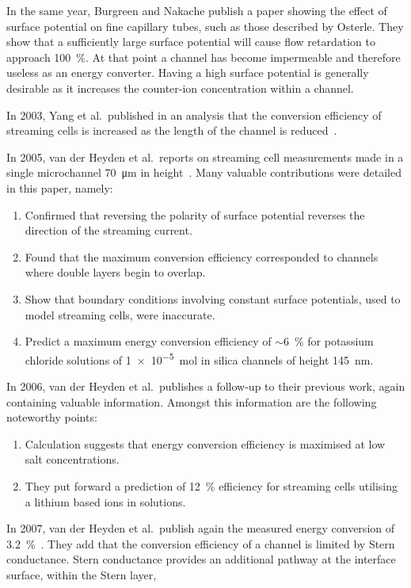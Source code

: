     In the same year, Burgreen and Nakache publish a paper showing the effect of surface potential on fine capillary tubes, such as those described by Osterle\cite{Burgreen1964}.
    They show that a sufficiently large surface potential will cause flow retardation to approach \SI{100}{\percent}.
    At that point a channel has become impermeable and therefore useless as an energy converter.
    Having a high surface potential is generally desirable as it increases the counter-ion concentration within a channel.

    In 2003, Yang et al.\ published in an analysis that the conversion efficiency of streaming cells is increased as the length of the channel is reduced~\cite{Yang2003}.

    In 2005, van der Heyden et al.\ reports on streaming cell measurements made in a single microchannel \SI{70}{\micro\meter} in height~\cite{VanderHeyden2005}.
    Many valuable contributions were detailed in this paper, namely:
    \begin{enumerate}
      \item Confirmed that reversing the polarity of surface potential reverses the direction of the streaming current.
      \item Found that the maximum conversion efficiency corresponded to channels where double layers begin to overlap.
      \item Show that boundary conditions involving constant surface potentials, used to model streaming cells, were inaccurate.
      \item Predict a maximum energy conversion efficiency of $\sim$\SI{6}{\percent} for potassium chloride solutions of \SI{1e-5}{\mole} in silica channels of height \SI{145}{\nano\meter}.
    \end{enumerate}

    In 2006, van der Heyden et al.\ publishes a follow-up to their previous work, again containing valuable information\cite{VanderHeyden2006}.
    Amongst this information are the following noteworthy points:
    \begin{enumerate}
      \item Calculation suggests that energy conversion efficiency is maximised at low salt concentrations.
      \item They put forward a prediction of \SI{12}{\percent} efficiency for streaming cells utilising a lithium based ions in solutions.
    \end{enumerate}

    In 2007, van der Heyden et al.\ publish again the measured energy conversion of \SI{3.2}{\percent}~\cite{Heyden2007}.
    They add that the conversion efficiency of a channel is limited by Stern conductance.
    Stern conductance provides an additional pathway at the interface surface, within the Stern layer,

